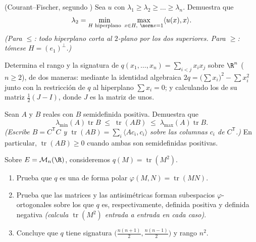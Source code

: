 \begin{exercise}[$\star\star\star$]\label{exo:b2:quadratic:9}
(Courant--Fischer, segundo ) Sea $u$  con
 $\lambda_1 \geq \lambda_2 \geq \dots \geq
\lambda_n$. Demuestra que
\[
\lambda_2 = \min_{\substack{H \text{ hiperplano}}}\;
\max_{\substack{x \in H,\ \norm x = 1}} \langle u(x), x\rangle .
\]
\emph{(Para $\leq$: todo hiperplano corta al $2$-plano  por
los dos  superiores. Para $\geq$: tómese $H =
(e_1)^{\perp}$.)}
\end{exercise}

\begin{exercise}[$\star\star$]\label{exo:b2:quadratic:10}
Determina el rango y la signatura de $q(x_1, \dots, x_n) = \sum_{i <
j} x_ix_j$ sobre $\R^n$ ($n \geq 2$), de dos maneras: mediante la
identidad algebraica $2q = \bigl(\sum x_i\bigr)^2 - \sum x_i^2$
junto con la restricción de $q$ al hiperplano $\sum x_i = 0$; y
calculando los  de su matriz $\frac12(J - I)$, donde
$J$ es la matriz de unos.
\end{exercise}

\begin{exercise}[$\star\star$]\label{exo:b2:quadratic:11}
Sean $A$ y $B$ reales  con $B$ semidefinida positiva.
Demuestra que
\[
\lambda_{\min}(A)\operatorname{tr} B
\;\leq\;
\operatorname{tr}(AB)
\;\leq\;
\lambda_{\max}(A)\operatorname{tr} B .
\]
\emph{(Escribe $B = C^{\mathsf T}C$ y $\operatorname{tr}(AB) =
\sum_i \langle A c_i, c_i\rangle$ sobre las columnas $c_i$ de
$C^{\mathsf T}$.)} En particular, $\operatorname{tr}(AB) \geq 0$
cuando ambas son semidefinidas positivas.
\end{exercise}

\begin{exercise}[$\star\star\star$]\label{exo:b2:quadratic:12}
Sobre $E = \mathcal{M}_n(\R)$, consideremos $q(M) =
\operatorname{tr}(M^2)$.
\begin{enumerate}
  \item Prueba que $q$ es una  de forma polar
        $\varphi(M, N) = \operatorname{tr}(MN)$.
  \item Prueba que las matrices  y las antisimétricas
        forman subespacios $\varphi$-ortogonales sobre los que $q$
        es, respectivamente, definida positiva y definida negativa
        \emph{(calcula $\operatorname{tr}(M^2)$ entrada a entrada en
        cada caso)}.
  \item Concluye que $q$ tiene signatura $\bigl(\frac{n(n+1)}{2},
        \frac{n(n-1)}{2}\bigr)$ y rango $n^2$.
\end{enumerate}
\end{exercise}

